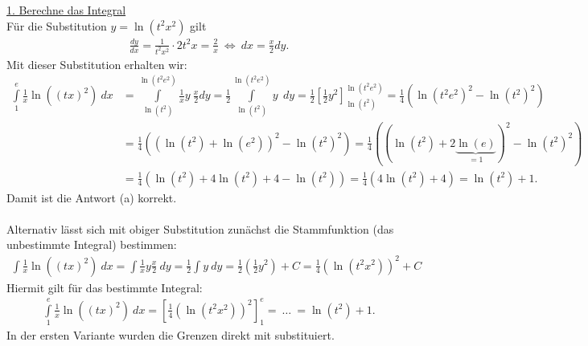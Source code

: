 \underline{1. Berechne das Integral}\\
Für die Substitution $y = \ln(t^2 x^2)$ gilt
\begin{align*}
	\frac{dy}{ dx} = \frac{1}{t^2 x^2} \cdot 2 t^2 x
				= \frac{2}{x}
	\ \Leftrightarrow \
	dx = \frac{x}{2} dy.
\end{align*}
Mit dieser Substitution erhalten wir:
\begin{align*}
	\int \limits_1^e \frac{1}{x} \ln\left((tx)^2\right) \ dx
	&=
	\int \limits_{\ln(t^2)}^{\ln(t^2 e^2)} \frac{1}{x} y \ \frac{x}{2} dy
	=
	\frac{1}{2}	\int \limits_{\ln(t^2)}^{\ln(t^2 e^2)}  y \ \ dy
	=
	\frac{1}{2} \left[ \frac{1}{2} y^2 
	\right]_{\ln(t^2)}^{\ln(t^2 e^2)}
	=
	\frac{1}{4}
	\left(
	\ln(t^2 e^2)^2 -  \ln(t^2)^2
	\right)\\
	&= 
	\frac{1}{4}
	\left(
	(\ln(t^2) + \ln(e^2))^2 -  \ln(t^2)^2
	\right)
	=
	\frac{1}{4}
	\left(
	(\ln(t^2) + 2\underbrace{\ln(e)}_{=1})^2 -  \ln(t^2)^2
	\right)\\
	&=
	\frac{1}{4}
	\left(
	\ln(t^2) + 4 \ln(t^2) +4 - \ln(t^2)
	\right)
	= 
	\frac{1}{4}
	\left(
	 4 \ln(t^2) +4 
	\right)
	= \ln(t^2) +1.
\end{align*}
Damit ist die Antwort (a) korrekt.\\
\\
Alternativ lässt sich mit obiger Substitution zunächst die Stammfunktion (das unbestimmte Integral) bestimmen:
\begin{align*}
	\int  \frac{1}{x} \ln\left((tx)^2\right) \ dx
	= 
	\int  \frac{1}{x} y \frac{x}{2}\ dy
	=
	\frac{1}{2} \int  y \ dy
	= 
	\frac{1}{2}
	\left(\frac{1}{2} y^2\right) +C
	=
	\frac{1}{4} (\ln(t^2 x^2))^2+C
\end{align*}
Hiermit gilt für das bestimmte Integral:
\begin{align*}
	\int \limits_1^e \frac{1}{x} \ln\left((tx)^2\right) \ dx
	=
	\left[\frac{1}{4} (\ln(t^2 x^2))^2\right]_1^e
	= \ \dots \ = \ln(t^2) +1.
\end{align*}
In der ersten Variante wurden die Grenzen direkt mit substituiert.

 
\newpage


